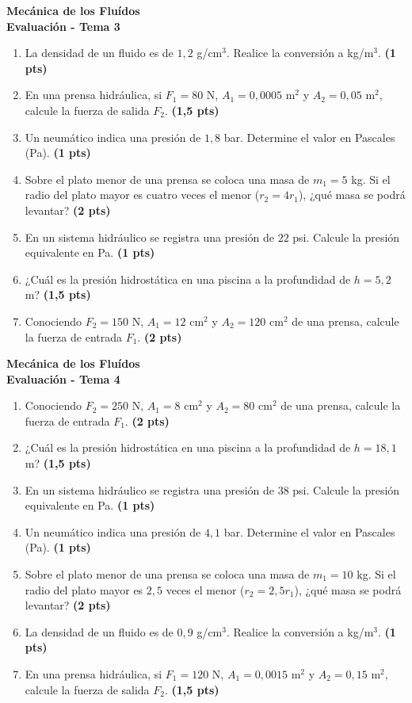 \documentclass[a4paper,12pt]{article}
\newcommand{\prob}[2]{\item #1 \textbf{(#2 pts)}}
\begin{document}
\vspace{0.2cm}

\noindent
\begin{minipage}[t][0.47\textheight][t]{0.48\textwidth}
  \begin{center}
    \textbf{\large Mecánica de los Fluídos}\\
    \textbf{\Large Evaluación - Tema 3}
  \end{center}
  \begin{enumerate}
    \prob{La densidad de un fluido es de $1,2$ g/cm$^3$. Realice la conversión a kg/m$^3$.}{1}
    \prob{En una prensa hidráulica, si $F_1=80$ N, $A_1=0,0005$ m$^2$ y $A_2=0,05$ m$^2$, calcule la fuerza de salida $F_2$.}{1,5}
    \prob{Un neumático indica una presión de $1,8$ bar. Determine el valor en Pascales (Pa).}{1}
    \prob{Sobre el plato menor de una prensa se coloca una masa de $m_1=5$ kg. Si el radio del plato mayor es cuatro veces el menor ($r_2=4r_1$), ¿qué masa se podrá levantar?}{2}
    \prob{En un sistema hidráulico se registra una presión de $22$ psi. Calcule la presión equivalente en Pa.}{1}
    \prob{¿Cuál es la presión hidrostática en una piscina a la profundidad de $h=5,2$ m?}{1,5}
    \prob{Conociendo $F_2=150$ N, $A_1=12$ cm$^2$ y $A_2=120$ cm$^2$ de una prensa, calcule la fuerza de entrada $F_1$.}{2}
  \end{enumerate}
\end{minipage}
\hfill
\begin{minipage}[t][0.47\textheight][t]{0.48\textwidth}
  \begin{center}
    \textbf{\large Mecánica de los Fluídos}\\
    \textbf{\Large Evaluación - Tema 4}
  \end{center}
  \begin{enumerate}
    \prob{Conociendo $F_2=250$ N, $A_1=8$ cm$^2$ y $A_2=80$ cm$^2$ de una prensa, calcule la fuerza de entrada $F_1$.}{2}
    \prob{¿Cuál es la presión hidrostática en una piscina a la profundidad de $h=18,1$ m?}{1,5}
    \prob{En un sistema hidráulico se registra una presión de $38$ psi. Calcule la presión equivalente en Pa.}{1}
    \prob{Un neumático indica una presión de $4,1$ bar. Determine el valor en Pascales (Pa).}{1}
    \prob{Sobre el plato menor de una prensa se coloca una masa de $m_1=10$ kg. Si el radio del plato mayor es $2,5$ veces el menor ($r_2=2,5r_1$), ¿qué masa se podrá levantar?}{2}
    \prob{La densidad de un fluido es de $0,9$ g/cm$^3$. Realice la conversión a kg/m$^3$.}{1}
    \prob{En una prensa hidráulica, si $F_1=120$ N, $A_1=0,0015$ m$^2$ y $A_2=0,15$ m$^2$, calcule la fuerza de salida $F_2$.}{1,5}
  \end{enumerate}
\end{minipage}
\end{document}
